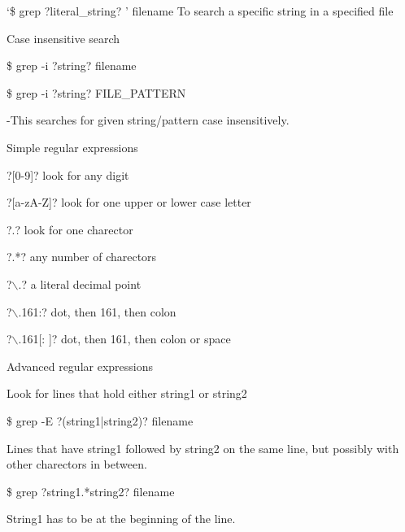 \documentclass{article}
\begin{document}
		     \hspace{10mm}`\$ grep ?literal\_string? ' filename To search a specific string in a specified file


	Case insensitive search
	
			        \hspace{10mm}\$ grep -i ?string? filename
			        
       				\hspace{10mm}\$ grep -i ?string? FILE\_PATTERN\*
				
				\hspace{10mm}-This searches for given string/pattern case insensitively.


	Simple regular expressions

				\hspace{10mm}?[0-9]? look for any digit



				\hspace{10mm}?[a-zA-Z]? look for one upper or lower case letter	


				\hspace{10mm}?.? look for one charector
				
				\hspace{10mm}?.*? any number of charectors
				
				\hspace{10mm} ?$\backslash$.? a literal decimal point
				
				\hspace{10mm}?$\backslash$.161:? dot, then 161, then colon 
				
				\hspace{10mm}?$\backslash$.161[: ]? dot, then 161, then colon or space	


	Advanced regular expressions

				\hspace{10mm}Look for lines that hold either string1 or string2
				
				\hspace{10mm}\$ grep -E ?(string1|string2)? filename 
				
				\hspace{10mm}Lines that have string1 followed by string2 on the same line, but possibly with other charectors in between.
				
				\hspace{10mm}\$ grep ?string1.*string2? filename	
				
				\hspace{10mm}String1 has to be at the beginning of the line.
				
\end{document}
